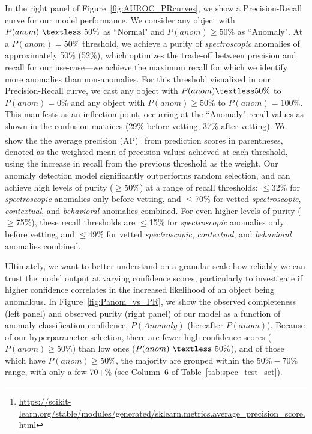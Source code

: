 \documentclass[twocolumn]{aastex63}
\begin{document}
In the right panel of Figure~\ref{fig:AUROC_PRcurves}, we show a Precision-Recall curve for our model performance. We consider any object with $P(anom)~\textless~50\%$ as ``Normal" and $P(anom)\geq50\%$ as ``Anomaly". At a $P(anom)=50$\% threshold, we achieve a purity of \emph{spectroscopic} anomalies of approximately 50\% (52\%), which optimizes the trade-off between precision and recall for our use-case---we achieve the maximum recall for which we identify more anomalies than non-anomalies. For this threshold visualized in our Precision-Recall curve, we cast any object with $P(anom)\textless50\%$ to $P(anom)=0\%$ and any object with $P(anom)\geq50\%$ to $P(anom)=100\%$. This manifests as an inflection point, occurring at the ``Anomaly" recall values as shown in the confusion matrices (29\% before vetting, 37\% after vetting). We show the the average precision (AP)\footnote{\url{https://scikit-learn.org/stable/modules/generated/sklearn.metrics.average_precision_score.html}} from prediction scores in parentheses, denoted as the weighted mean of precision values achieved at each threshold, using the increase in recall from the previous threshold as the weight. Our anomaly detection model significantly outperforms random selection, and can achieve high levels of purity ($\geq$50\%) at a range of recall thresholds: $\leq$32\% for \emph{spectroscopic} anomalies only before vetting, and $\leq$70\% for vetted \emph{spectroscopic}, \emph{contextual}, and \emph{behavioral} anomalies combined. For even higher levels of purity ($\geq$75\%), these recall thresholds are $\leq$15\% for \emph{spectroscopic} anomalies only before vetting, and $\leq$49\% for vetted \emph{spectroscopic}, \emph{contextual}, and \emph{behavioral} anomalies combined. \par

Ultimately, we want to better understand on a granular scale how reliably we can trust the model output at varying confidence scores, particularly to investigate if higher confidence correlates in the increased likelihood of an object being anomalous. In Figure~\ref{fig:Panom_vs_PR}, we show the observed completeness (left panel) and observed purity (right panel) of our model as a function of anomaly classification confidence, $P(Anomaly)$ (hereafter $P(anom)$). Because of our hyperparameter selection, there are fewer high confidence scores ($P(anom)\geq50\%$) than low ones ($P(anom)~\textless~50\%$), and of those which have $P(anom)\geq50\%$, the majority are grouped within the $50\%-70\%$ range, with only a few 70+\% (see Column~6 of Table~\ref{tab:spec_test_set}). \par
\end{document}
